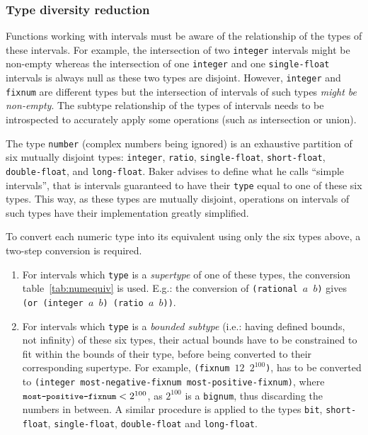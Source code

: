 \documentclass[format=sigconf]{acmart}
\newcommand\code[2][\small]{\sloppy\texttt{#1#2}}
\newcommand\mcode[2][\small]{\text{\code[#1]{#2}}}
\theoremstyle{definition}
\begin{document}
\subsubsection{Type diversity reduction}
\label{sec:tdred}
Functions working with intervals must be aware of the relationship of the types
of these intervals. For example, the intersection of two \code{integer}
intervals might be non-empty whereas the intersection of one \code{integer} and
one \code{single-float} intervals is always null as these two types are disjoint.
However, \code{integer} and \code{fixnum} are different types but the
intersection of intervals of such types \emph{might be non-empty}.
The subtype relationship of the types of intervals needs to be introspected to
accurately apply some operations (such as intersection or union).

The type \code{number} (complex numbers being ignored) is an exhaustive
partition of six mutually disjoint types: \code{integer}, \code{ratio},
\code{single-float}, \code{short-float}, \code{double-float}, and
\code{long-float}.
Baker advises to define what he calls ``simple intervals'', that is intervals
guaranteed to have their \code{type} equal to one of these six types. This way,
as these types are mutually disjoint, operations on intervals of such types have
their implementation greatly simplified.

To convert each numeric type into its equivalent using only the six types above,
a two-step conversion is required.
\begin{enumerate}
\item For intervals which \code{type} is a \emph{supertype} of one of these
  types, the conversion table~\ref{tab:numequiv} is used. E.g.: the conversion
  of \code{(rational $a$ $b$)} gives \code{(or (integer $a$ $b$) (ratio $a$
    $b$))}.
\item For intervals which \code{type} is a \emph{bounded subtype} (i.e.: having
  defined bounds, not infinity) of these six types, their actual bounds have to
  be constrained to fit within the bounds of their type, before being converted
  to their corresponding supertype. For example, \code{(fixnum $12$ $2^{100}$)},
  has to be converted to \code{(integer most-negative-fixnum
    most-positive-fixnum)}, where $\mcode{most-positive-fixnum} < 2^{100}$, as
  $2^{100}$ is a \code{bignum}, thus discarding the numbers in between.
  A similar procedure is applied to the types \code{bit}, \code{short-float},
  \code{single-float}, \code{double-float} and \code{long-float}.
\end{enumerate}
\end{document}
